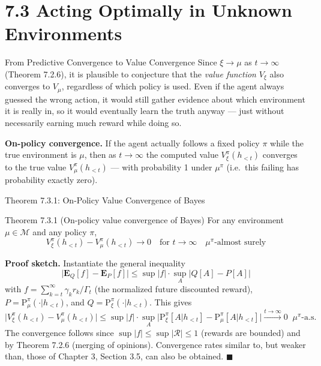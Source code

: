 \documentclass[aspectratio=169,10pt]{beamer}
\newcommand{\Mcal}{\mathcal{M}}
\newcommand{\Rcal}{\mathcal{R}}
\begin{document}
\section{7.3 Acting Optimally in Unknown Environments}

\begin{frame}{From Predictive Convergence to Value Convergence}
  Since $\xi\to\mu$ as $t\to\infty$ (Theorem 7.2.6), it is plausible to
  conjecture that the \emph{value function} $V_\xi$ also converges to
  $V_\mu$, regardless of which policy is used. Even if the agent always
  guessed the wrong action, it would still gather evidence about which
  environment it is really in, so it would eventually learn the truth
  anyway --- just without necessarily earning much reward while doing so.

  \vspace{2mm}
  \textbf{On-policy convergence.} If the agent actually follows a fixed
  policy $\pi$ while the true environment is $\mu$, then as $t\to\infty$ the
  computed value $V_\xi^\pi(h_{<t})$ converges to the true value
  $V_\mu^\pi(h_{<t})$ --- with probability 1 under $\mu^\pi$ (i.e.\ this
  failing has probability exactly zero).
\end{frame}

\begin{frame}{Theorem 7.3.1: On-Policy Value Convergence of Bayes}
  \begin{block}{Theorem 7.3.1 (On-policy value convergence of Bayes)}
    For any environment $\mu\in\Mcal$ and any policy $\pi$,
    \[
      V_\xi^\pi(h_{<t}) - V_\mu^\pi(h_{<t}) \longrightarrow 0
      \quad\text{for } t\to\infty \quad \mu^\pi\text{-almost surely}
    \]
  \end{block}
  \textbf{Proof sketch.} Instantiate the general inequality
  \[
    \big|\mathbf{E}_Q[f]-\mathbf{E}_P[f]\big|
    \le \sup|f|\cdot\sup_A\big|Q[A]-P[A]\big|
  \]
  with $f=\sum_{k=t}^\infty\gamma_k r_k/\Gamma_t$ (the normalized future
  discounted reward), $P=\mathrm{P}_\mu^\pi(\cdot|h_{<t})$, and
  $Q=\mathrm{P}_\xi^\pi(\cdot|h_{<t})$. This gives
  \[
    \big|V_\xi^\pi(h_{<t}) - V_\mu^\pi(h_{<t})\big|
    \le \sup|f|\cdot\sup_A\big|\mathrm{P}_\xi^\pi[A|h_{<t}]-\mathrm{P}_\mu^\pi[A|h_{<t}]\big|
    \xrightarrow{t\to\infty} 0 \;\; \mu^\pi\text{-a.s.}
  \]
  The convergence follows since $\sup|f|\le\sup|\Rcal|\le1$ (rewards are
  bounded) and by Theorem 7.2.6 (merging of opinions). Convergence rates
  similar to, but weaker than, those of Chapter 3, Section 3.5, can also be
  obtained. $\blacksquare$
\end{frame}
\end{document}

